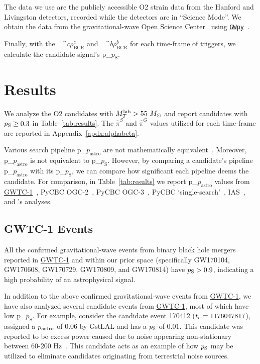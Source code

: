 \documentclass[
 nofootinbib,
 amsmath,amssymb,
 aps,
 twocolumn,
 superscriptaddress
]{revtex4-2}
\newcommand{\gwpy}{{\sc \href{https://gwpy.github.io/}{\texttt{GWpy}}}\xspace}
\newcommand{\gstlal}{{\sc GstLAL}\xspace}
\newcommand{\GWTC}{{\sc \href{https://ui.adsabs.harvard.edu/abs/2019PhRvX...9c1040A/abstract}{{GWTC-1}}}\xspace}
\newcommand{\fancytext}[1]{{\relax\ifmmode#1\else $#1$\fi}\xspace}
\newcommand{\mathcmd}[1]{{\sc \relax\ifmmode#1\else $#1$\fi}\xspace}
\newcommand{\bgrdbcr}{\mathcmd{\rho_\text{BCR}^\textit{b}}}
\newcommand{\candbcr}{\mathcmd{\rho_\text{BCR}^\textit{c}}}
\newcommand{\msun}{\mathcmd{M_\odot}}
\newcommand{\totMlab}{\mathcmd{M_T^{\rm{lab}}}}
\newcommand{\pastro}{\fancytext{p_\text{astro}}}
\newcommand{\pastrobcr}{\fancytext{p_\text{S}}}
\newcommand{\tc}{\fancytext{t_c}}
\begin{document}
The data we use are the publicly accessible O2 strain data from the Hanford and Livingston detectors, recorded while the detectors are in ``Science Mode''. We obtain the data from the gravitational-wave Open Science Center~\cite{GWOSC} using \gwpy~\cite{gwpy}. 

Finally, with the \candbcr and \bgrdbcr for each time-frame of triggers, we calculate the candidate signal's \pastrobcr. 

\section{\label{sec:Results}Results}

We analyze the O2 candidates with $\totMlab > 55~\msun$ and report candidates with $\pastrobcr\geq0.3$ in Table~\ref{tab:results}. The $\hat{\pi}^S$ and $\hat{\pi}^G$ values utilized for each time-frame are reported in Appendix~\ref{apdx:alphabeta}. 

Various search pipeline \pastro are not mathematically equivalent~\cite{Galaudage:2020:PhRvD}. Moreover, \pastro is not equivalent to \pastrobcr. However, by comparing a candidate's pipeline \pastro with its \pastrobcr, we can compare how significant each pipeline deems the candidate. For comparison, in Table~\ref{tab:results} we report \pastro values from \GWTC~\cite{GWTC1}, PyCBC OGC-2~\cite{pycbc_ogc_2}, PyCBC OGC-3~\cite{pycbc_ogc_2}, PyCBC `single-search'~\cite{pycbc_single_det}, IAS~\cite{IAS1, IAS2}, and \citet{bayesian_odds}'s analyses.



\subsection{GWTC-1 Events}
All the confirmed gravitational-wave events from binary black hole mergers reported in \GWTC and within our prior space (specifically GW170104, GW170608, GW170729, GW170809, and GW170814) have $\pastrobcr>0.9$, indicating a high probability of an astrophysical signal. 

In addition to the above confirmed gravitational-wave events from \GWTC, we have also analyzed several candidate events from \GWTC, most of which have low \pastrobcr. For example, consider the candidate event 170412 ($\tc = 1176047817$), assigned a $\pastro$ of $0.06$ by \gstlal and has a $\pastrobcr$ of $0.01$. This candidate was reported to be excess power caused due to noise appearing non-stationary between 60-200 Hz~\cite{GWTC1}. This candidate acts as an example of how $\pastrobcr$ may be utilized to eliminate candidates originating from terrestrial noise sources. 
\end{document}
